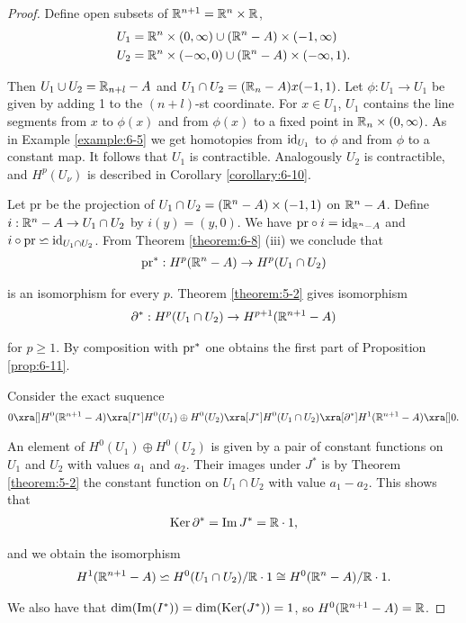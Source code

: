 \begin{proof}
  Define open subsets of $\mathbb{R}^{n+1} = \mathbb{R}^n\times\mathbb{R}$,
  \begin{align*}
    U_1 & = \mathbb{R}^n \times (0, \infty)\cup (\mathbb{R}^n-A)\times(-1, \infty)\\
    U_2 & = \mathbb{R}^n \times (-\infty, 0)\cup (\mathbb{R}^n-A)\times(-\infty, 1).
  \end{align*}

  Then $U_1\cup U_2 = \mathbb{R}_{n+l} - A$ and $U_1\cap U_2 = (\mathbb{R}_n - A) x (-1,1)$. 
  Let $\phi: U_1\to U_1$ be given by adding 1 to the $(n + l)$-st coordinate. For $x\in U_1$, $U_1$ contains the
line segments from $x$ to $\phi(x)$ and from $\phi(x)$ to a fixed point in $\mathbb{R}_n\times (0, \infty)$. As
in Example \ref{example:6-5} we get homotopies from $\operatorname{id}_{U_1}$ to $\phi$ and from $\phi$ to a constant map.
It follows that $U_1$ is contractible. Analogously $U_2$ is contractible, and $H^p(U_\nu)$ is
described in Corollary \ref{corollary:6-10}.

Let pr be the projection of $U_1\cap U_2 = (\mathbb{R}^n-A)\times(-1, 1)$ on $\mathbb{R}^n - A$. Define $i:\mathbb{R}^n-A\to U_1\cap U_2$ 
by $i(y) = (y, 0)$. We have $\mathrm{pr}\circ i = \operatorname{id}_{\mathbb{R}^n-A}$ and $i\circ\mathrm{pr}\backsimeq\operatorname{id}_{U_1\cap U_2}$. From Theorem \ref{theorem:6-8}
(iii) we conclude that 
\begin{align*}
  \mathrm{pr}^*: H^p(\mathbb{R}^n - A)\to H^p(U_1\cap U_2)
\end{align*}

is an isomorphism for every $p$. Theorem \ref{theorem:5-2} gives isomorphism
\begin{align*}
  \partial^*: H^p(U_1\cap U_2)\to H^{p+1}(\mathbb{R}^{n+1} - A)
\end{align*}

for $p\ge 1$. By composition with $\mathrm{pr}^*$ one obtains the first part of Proposition \ref{prop:6-11}.

Consider the exact suquence
\begin{align*}
  0\xra[]H^0(\RR^{n+1}-A)\xra[I^*]H^0(U_1)\oplus H^0(U_2)\xra[J^*]H^0(U_1\cap U_2)\xra[\partial^*] 
  H^1(\RR^{n+1}-A)\xra[]0.
\end{align*}

An element of $H^0(U_1)\oplus H^0(U_2)$ is given by a pair of constant functions on $U_1$ and $U_2$ with values $a_1$ and $a_2$. 
Their images under $J^*$ is by Theorem \ref{theorem:5-2} the constant function on $U_1\cap U_2$ with value $a_1 - a_2$. This shows 
that 
\begin{align*}
  \operatorname{Ker}\partial^* = \operatorname{Im} J^* = \mathbb{R}\cdot 1,
\end{align*}

and we obtain the isomorphism
\begin{align*}
  H^1(\mathbb{R}^{n+1}-A) \backsimeq H^0(U_1\cap U_2)/{\mathbb{R}\cdot 1}
  \cong H^0(\mathbb{R}^n - A)/\mathbb{R}\cdot 1.
\end{align*}

We also have that $\dim(\operatorname{Im}(I^*)) = \dim(\operatorname{Ker}(J^*)) = 1$, so $H^0(\mathbb{R}^{n+1}-A) = \mathbb{R}$. 
\end{proof}


